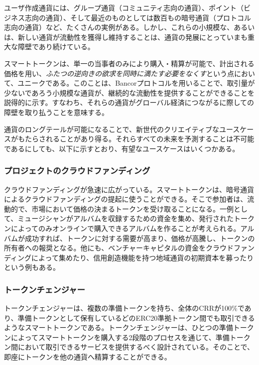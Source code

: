 \documentclass{jsarticle}
\begin{document}
    ユーザ作成通貨には、グループ通貨（コミュニティ志向の通貨）、ポイント（ビジネス志向の通貨）、そして最近のものとしては数百もの暗号通貨（プロトコル志向の通貨）など、たくさんの実例がある。しかし、これらの小規模な、あるいは、新しい通貨が流動性を獲得し維持することは、通貨の発展にとっていまも重大な障壁であり続けている。

    スマートトークンは、単一の当事者のみにより購入・精算が可能で、計出される価格を用い、\emph{ふたつの逆向きの欲求を同時に満たす必要をなくす}という点において、ユニークである。このことは、Bancorプロトコルを用いることで、取引量が少ないであろう小規模な通貨が、継続的な流動性を提供することができることを説得的に示す。すなわち、それらの通貨がグローバル経済につながるに際しての障壁を取り払うことを意味する。

    通貨のロングテールが可能になることで、新世代のクリエイティブなユースケースがもたらされることがあり得る。それらすべての未来を予測することは不可能であるにしても、以下に示すとおり、有望なユースケースはいくつかある。

    \subsubsection{プロジェクトのクラウドファンディング}

    クラウドファンディングが急速に広がっている。スマートトークンは、暗号通貨によるクラウドファンディングの提起に使うことができる。そこで参加者は、流動的で、市場において価格の決まるトークンを受け取ることになる。一例として、ミュージシャンがアルバムを収録するための資金を集め、発行されたトークンによってのみオンラインで購入できるアルバムを作ることが考えられる。アルバムが成功すれば、トークンに対する需要が高まり、価格が高騰し、トークンの所有者への報奨となる。他にも、ベンチャーキャピタルの資金をクラウドファンディングによって集めたり、信用創造機能を持つ地域通貨の初期資本を募ったりという例もある。

    \subsubsection{トークンチェンジャー}

    トークンチェンジャーは、複数の準備トークンを持ち、全体のCRRが100\%であり、準備トークンとして保有しているどのERC20準拠トークン間でも取引できるようなスマートトークンである。トークンチェンジャーは、ひとつの準備トークンによってスマートトークンを購入する2段階のプロセスを通じて、準備トークン間において取引できるサービスを提供するべく設計されている。そのことで、即座にトークンを他の通貨へ精算することができる。
\end{document}
